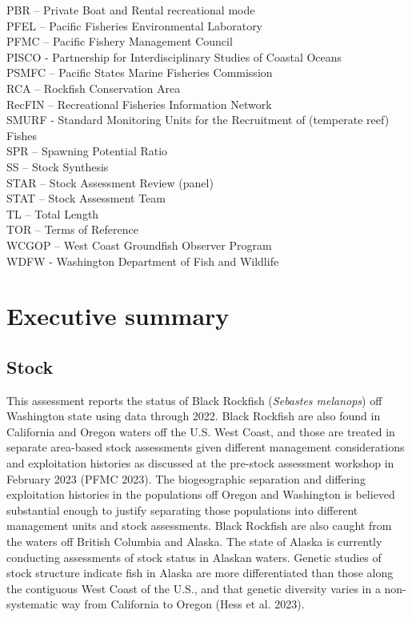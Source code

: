 \documentclass[11pt,
  english,
  letterpaper,
]{article}
\begin{document}
PBR -- Private Boat and Rental recreational mode\\
PFEL -- Pacific Fisheries Environmental Laboratory\\
PFMC -- Pacific Fishery Management Council\\
PISCO - Partnership for Interdisciplinary Studies of Coastal Oceans\\
PSMFC -- Pacific States Marine Fisheries Commission\\
RCA -- Rockfish Conservation Area\\
RecFIN -- Recreational Fisheries Information Network\\
SMURF - Standard Monitoring Units for the Recruitment of (temperate reef) Fishes\\
SPR -- Spawning Potential Ratio\\
SS -- Stock Synthesis\\
STAR -- Stock Assessment Review (panel)\\
STAT -- Stock Assessment Team\\
TL -- Total Length\\
TOR -- Terms of Reference\\
WCGOP -- West Coast Groundfish Observer Program\\
WDFW - Washington Department of Fish and Wildlife

\newpage

\hypertarget{executive-summary}{%
\section*{Executive summary}\label{executive-summary}}

\hypertarget{stock}{%
\subsection*{Stock}\label{stock}}

This assessment reports the status of Black Rockfish (\emph{Sebastes melanops}) off Washington state using data through 2022. Black Rockfish are also found in California and Oregon waters off the U.S. West Coast, and those are treated in separate area-based stock assessments given different management considerations and exploitation histories as discussed at the pre-stock assessment workshop in February 2023 (PFMC 2023). The biogeographic separation and differing exploitation histories in the populations off Oregon and Washington is believed substantial enough to justify separating those populations into different management units and stock assessments. Black Rockfish are also caught from the waters off British Columbia and Alaska. The state of Alaska is currently conducting assessments of stock status in Alaskan waters. Genetic studies of stock structure indicate fish in Alaska are more differentiated than those along the contiguous West Coast of the U.S., and that genetic diversity varies in a non-systematic way from California to Oregon (Hess et al. 2023).
\end{document}
